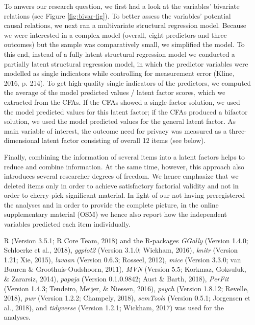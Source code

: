 \documentclass[man,floatsintext]{apa6}
\begin{document}
To anwers our research question, we first had a look at the variables' bivariate relations (see Figure \ref{fig:bivar-fig}). To better assess the variables' potential causal relations, we next ran a multivariate structural regression model. Because we were interested in a complex model (overall, eight predictors and three outcomes) but the sample was comparatively small, we simplified the model. To this end, instead of a fully latent structural regression model we conducted a partially latent structural regression model, in which the predictor variables were modelled as single indicators while controlling for measurement error (Kline, 2016, p. 214). To get high-quality single indicators of the predictors, we computed the average of the model predicted values / latent factor scores, which we extracted from the CFAs. If the CFAs showed a single-factor solution, we used the model predicted values for this latent factor; if the CFAs produced a bifactor solution, we used the model predicted values for the general latent factor. As main variable of interest, the outcome need for privacy was measured as a three-dimensional latent factor consisting of overall 12 items (see below).

Finally, combining the information of several items into a latent factors helps to reduce and combine information. At the same time, however, this approach also introduces several researcher degrees of freedom. We hence emphasize that we deleted items only in order to achieve satisfactory factorial validity and not in order to cherry-pick significant material. In light of our not having preregistered the analyses and in order to provide the complete picture, in the online supplementary material (OSM) we hence also report how the independent variables predicted each item individually.

R (Version 3.5.1; R Core Team, 2018) and the R-packages \emph{GGally} (Version 1.4.0; Schloerke et al., 2018), \emph{ggplot2} (Version 3.1.0; Wickham, 2016), \emph{knitr} (Version 1.21; Xie, 2015), \emph{lavaan} (Version 0.6.3; Rosseel, 2012), \emph{mice} (Version 3.3.0; van Buuren \& Groothuis-Oudshoorn, 2011), \emph{MVN} (Version 5.5; Korkmaz, Goksuluk, \& Zararsiz, 2014), \emph{papaja} (Version 0.1.0.9842; Aust \& Barth, 2018), \emph{PerFit} (Version 1.4.3; Tendeiro, Meijer, \& Niessen, 2016), \emph{psych} (Version 1.8.12; Revelle, 2018), \emph{pwr} (Version 1.2.2; Champely, 2018), \emph{semTools} (Version 0.5.1; Jorgensen et al., 2018), and \emph{tidyverse} (Version 1.2.1; Wickham, 2017) was used for the analyses.
\end{document}
